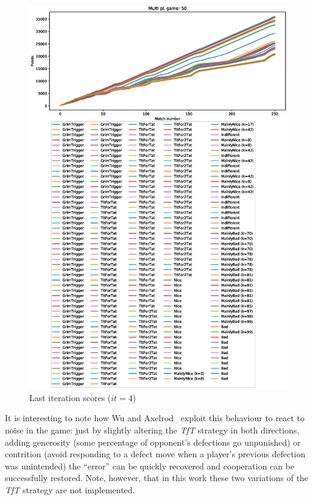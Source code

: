 \documentclass[journal,10pt,twoside]{IEEEtran}
\begin{document}
\begin{figure}[!ht]
    \centering
    \includegraphics[width=1\columnwidth]{../img/ripdmp-incr/ripdmp-scores-increasing-pop-50-r4}
    \caption{Last iteration scores ($it=4$)}
    \label{fig:incrLI}
\end{figure}

It is interesting to note how Wu and Axelrod~\cite{IPDnoise} exploit this behaviour to react to noise in the game: just by slightly altering the \textit{TfT} strategy in both directions, adding generosity (some percentage of opponent's defections go unpunished) or contrition (avoid responding to a defect move when a player's previous defection was unintended) the ``error'' can be quickly recovered and cooperation can be successfully restored. Note, however, that in this work these two variations of the \textit{TfT} strategy are not implemented.
\end{document}
